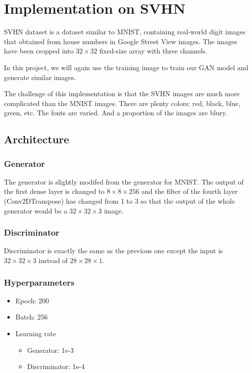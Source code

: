 \documentclass{article}
\begin{document}
\section{Implementation on SVHN}

SVHN dataset is a dataset similar to MNIST, containing real-world digit images that obtained from house numbers in Google Street View images.
The images have been cropped into $32\times 32$ fixed-size array with three channels.

In this project, we will again use the training image to train our GAN model and generate similar images.

The challenge of this implementation is that the SVHN images are much more complicated than the MNIST images. 
There are plenty colors: red, black, blue, green, etc. The fonts are varied. And a proportion of the images are blury.

\subsection{Architecture}

\subsubsection{Generator}

The generator is slightly modifed from the generator for MNIST. 
The output of the first dense layer is changed to $8\times 8\times 256$ 
and the filter of the fourth layer (Conv2DTranspose) has changed from 1 to 3
so that the output of the whole generator would be a $32\times 32\times 3$ image.

\subsubsection{Discriminator}

Discriminator is exactly the same as the previous one except the input is $32\times 32\times 3$ instead of $28\times 28\times 1$.

\subsubsection{Hyperparameters}

\begin{itemize}
  \item Epoch: 200
  \item Batch: 256
  \item Learning rate
    \begin{itemize}
      \item Generator: 1e-3
      \item Discriminator: 1e-4
    \end{itemize}
\end{itemize}
\end{document}
